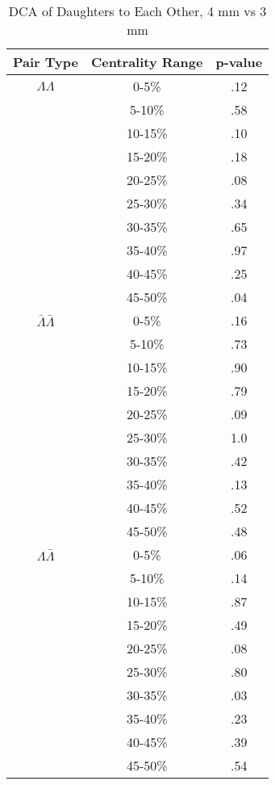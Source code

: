 \begin{table}
\begin{minipage}{18pc}

\caption {DCA of Daughters to Each Other, 4 mm vs 3 mm} \label{tab:DcaDaughtersEachOtherPvalueTests4mmVs3mm}
\begin{center}
\begin{tabular}{| c | c | c |}
  \hline                       
  Pair Type & Centrality Range & p-value \\
  \hline
  $\Lambda\Lambda$ & 0-5\% & .12 \\
   & 5-10\%  & .58 \\
   & 10-15\% & .10 \\
   & 15-20\% & .18 \\
   & 20-25\% & .08 \\
   & 25-30\% & .34 \\
   & 30-35\% & .65 \\
   & 35-40\% & .97 \\
   & 40-45\% & .25 \\
   & 45-50\% & .04 \\
   \hline
  $\bar{\Lambda}\bar{\Lambda}$ &  0-5\% & .16 \\
   & 5-10\% & .73 \\
   & 10-15\% & .90 \\
   & 15-20\% & .79 \\
   & 20-25\% & .09 \\
   & 25-30\% & 1.0 \\
   & 30-35\% & .42 \\
   & 35-40\% & .13 \\
   & 40-45\% & .52 \\
   & 45-50\% & .48 \\
   \hline
  $\Lambda\bar{\Lambda}$ &  0-5\% & .06 \\
   & 5-10\% & .14 \\
   & 10-15\% & .87 \\
   & 15-20\% & .49 \\
   & 20-25\% & .08 \\
   & 25-30\% & .80 \\
   & 30-35\% & .03 \\
   & 35-40\% & .23 \\
   & 40-45\% & .39 \\
   & 45-50\% & .54 \\
  \hline  
\end{tabular}
\end{center}
\end{minipage}

\end{table}

